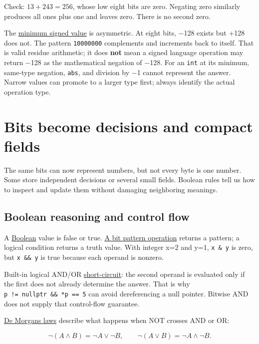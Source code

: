Check: \(13+243=256\), whose low eight bits are zero. Negating zero similarly produces all ones plus one and leaves zero. There is no second zero.

The \hyperref[appendix-05f39b10364d]{minimum signed value} is asymmetric. At eight bits, −128 exists but +128 does not. The pattern \texttt{10000000} complements and increments back to itself. That is valid residue arithmetic; it does \textbf{not} mean a signed language operation may return −128 as the mathematical negation of −128. For an \texttt{int} at its minimum, same-type negation, \texttt{abs}, and division by −1 cannot represent the answer. Narrow values can promote to a larger type first; always identify the actual operation type.

\section{Bits become decisions and compact fields}\label{01-foundations-i-ch001-bits-become-decisions-and-compact-fields}

The same bits can now represent numbers, but not every byte is one number. Some store independent decisions or several small fields. Boolean rules tell us how to inspect and update them without damaging neighboring meanings.

\subsection{Boolean reasoning and control flow}\label{01-foundations-i-ch001-boolean-reasoning-and-control-flow}

A \hyperref[appendix-24475e1596a8]{Boolean} value is false or true. \hyperref[appendix-fe6b457d68d8]{A bit pattern operation} returns a pattern; a logical condition returns a truth value. With integer x=2 and y=1, \texttt{x\ \&\ y} is zero, but \texttt{x\ \&\&\ y} is true because each operand is nonzero.

Built-in logical AND/OR \hyperref[appendix-2e245a6fa8d3]{short-circuit}: the second operand is evaluated only if the first does not already determine the answer. That is why \texttt{p\ !=\ nullptr\ \&\&\ *p\ ==\ 5} can avoid dereferencing a null pointer. Bitwise AND does not supply that control-flow guarantee.

\hyperref[appendix-9079d3659da4]{De Morgan\textquotesingle s laws} describe what happens when NOT crosses AND or OR:

\[
\neg(A\land B)=\neg A\lor\neg B,\qquad
\neg(A\lor B)=\neg A\land\neg B.
\]

